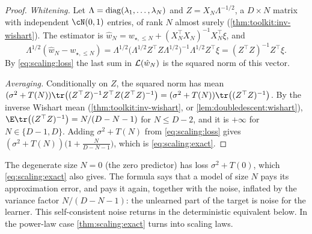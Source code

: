 \begin{refsection}
\begin{proof}
\emph{Whitening.} Let $\Lambda=\operatorname{diag}(\lambda_1,\dots,\lambda_N)$ and $Z=X_N\Lambda^{-1/2}$, a $D\times N$ matrix with independent $\cN(0,1)$ entries, of rank $N$ almost surely (\cref{thm:toolkit:inv-wishart}). The estimator is $\hat w_N=w_{\star,\le N}+(X_N^\top X_N)^{-1}X_N^\top\xi$, and
\[
  \Lambda^{1/2}(\hat w_N-w_{\star,\le N})=\Lambda^{1/2}\bigl(\Lambda^{1/2}Z^\top Z\Lambda^{1/2}\bigr)^{-1}\Lambda^{1/2}Z^\top\xi=(Z^\top Z)^{-1}Z^\top\xi .
\]
By \eqref{eq:scaling:loss} the last sum in $\mathcal{L}(\hat w_N)$ is the squared norm of this vector.

\emph{Averaging.} Conditionally on $Z$, the squared norm has mean $(\sigma^2+T(N))\tr\bigl((Z^\top Z)^{-1}Z^\top Z(Z^\top Z)^{-1}\bigr)=(\sigma^2+T(N))\tr\bigl((Z^\top Z)^{-1}\bigr)$. By the inverse Wishart mean (\cref{thm:toolkit:inv-wishart}, or \cref{lem:doubledescent:wishart}), $\E\tr\bigl((Z^\top Z)^{-1}\bigr)=N/(D-N-1)$ for $N\le D-2$, and it is $+\infty$ for $N\in\{D-1,D\}$. Adding $\sigma^2+T(N)$ from \eqref{eq:scaling:loss} gives $(\sigma^2+T(N))\bigl(1+\frac N{D-N-1}\bigr)$, which is \eqref{eq:scaling:exact}.
\end{proof}

The degenerate size $N=0$ (the zero predictor) has loss $\sigma^2+T(0)$, which \eqref{eq:scaling:exact} also gives. The formula says that a model of size $N$ pays its approximation error, and pays it again, together with the noise, inflated by the variance factor $N/(D-N-1)$: the unlearned part of the target is noise for the learner. This self-consistent noise returns in the deterministic equivalent below. In the power-law case \cref{thm:scaling:exact} turns into scaling laws.



\end{refsection}
